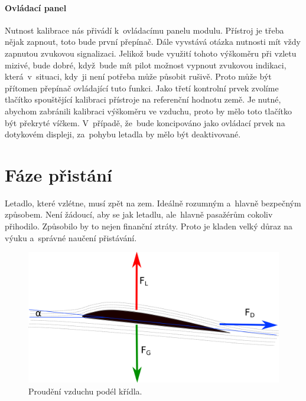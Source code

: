 			\paragraph{Ovládací panel}
				Nutnost kalibrace nás přivádí k~ovládacímu panelu modulu. Přístroj je třeba nějak zapnout, toto bude první přepínač. Dále vyvstává otázka nutnosti mít vždy zapnutou zvukovou signalizaci. Jelikož bude využití tohoto výškoměru při vzletu mizivé, bude dobré, když~bude mít pilot možnost vypnout zvukovou indikaci, která~v~situaci, kdy~ji není potřeba může působit rušivě. Proto může být přítomen přepínač ovládající tuto funkci. Jako třetí kontrolní prvek zvolíme tlačítko spouštějící kalibraci přístroje na referenční hodnotu země. Je nutné, abychom zabránili kalibraci výškoměru ve vzduchu, proto by mělo toto tlačítko být překryté víčkem. V~případě, že~bude koncipováno jako ovládací prvek na dotykovém displeji, za~pohybu letadla by mělo být deaktivované.
				
	\section{Fáze přistání}
		Letadlo, které vzlétne, musí zpět na zem. Ideálně rozumným a~hlavně bezpečným způsobem. Není žádoucí, aby se jak letadlu, ale~hlavně pasažérům cokoliv přihodilo. Způsobilo by to nejen finanční ztráty. Proto je kladen velký důraz na výuku a~správné naučení přistávání.  

		\begin{figure}[H]
			\begin{center}
				\includegraphics[scale=0.7]{obrazky-figures/angle_of_attack.png}
				\caption{Proudění vzduchu podél křídla.}
				\label{teorie::pristani::angle_of_attack}
			\end{center}
		\end{figure}
		
